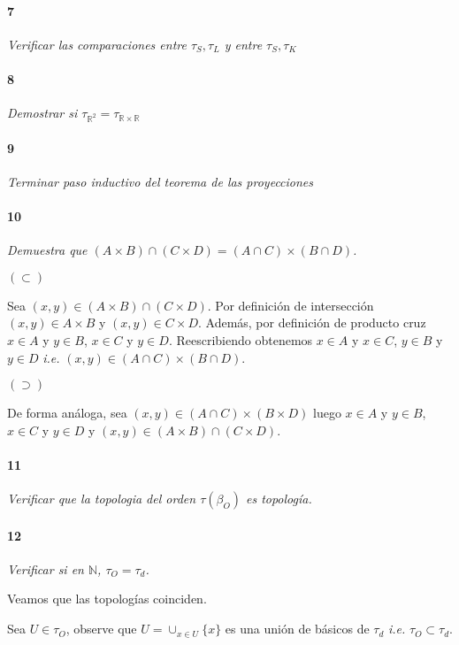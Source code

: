 \documentclass[12pt]{article}
\begin{document}
\paragraph{7}
\textit{Verificar las comparaciones entre $\tau_S, \tau_L$ y entre $\tau_S, \tau_K$}

\paragraph{8}
\textit{Demostrar si $\tau_{\mathbb{R}^2}=\tau_{\mathbb{R} \times \mathbb{R}}$}

\paragraph{9}
\textit{Terminar paso inductivo del teorema de las proyecciones}

\paragraph{10}
\textit{Demuestra que $(A \times B) \cap (C \times D)= (A \cap C) \times (B \cap D)$.}

$(\subset)$

Sea $(x,y) \in (A \times B) \cap (C \times D)$. Por definición de intersección $(x,y)\in A\times B$ y $(x,y) \in C\times D$. Además, por definición
de producto cruz $x \in A $ y $y \in B$, $x \in C$ y $y \in D$. Reescribiendo obtenemos $x\in A$ y $x\in C$, $y \in B$ y $y\in D$ \textit{i.e.}  $(x,y) \in (A \cap C)\times (B \cap D)$.

$(\supset)$

De forma análoga, sea $(x,y) \in (A \cap C) \times (B \times D)$ luego  $x \in A $ y $y \in B$, $x \in C$ y $y \in D$ y $(x,y) \in (A \times B) \cap (C \times D)$.

\paragraph{11}
\textit{Verificar que la topologia del orden $\tau(\beta_O)$ es topología.}

\paragraph{12}
\textit{Verificar si en $\mathbb{N}$,  $\tau_O =\tau_d$.}

Veamos que las topologías coinciden.

Sea $U \in \tau_O$, observe que $U= \cup_{x\in U} \{x\}$ es una unión de básicos de $\tau_d$ \textit{i.e.} $\tau_O \subset \tau_d$.
\end{document}
